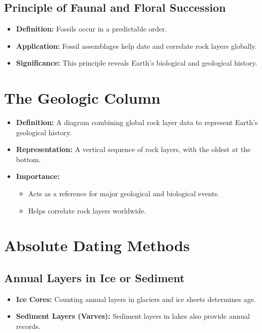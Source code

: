 \documentclass[12pt]{article}
\begin{document}
\subsection*{Principle of Faunal and Floral Succession}
\begin{itemize}
    \item \textbf{Definition:} Fossils occur in a predictable order.
    \item \textbf{Application:} Fossil assemblages help date and correlate rock layers globally.
    \item \textbf{Significance:} This principle reveals Earth's biological and geological history.
\end{itemize}

\section*{The Geologic Column}
\begin{itemize}
    \item \textbf{Definition:} A diagram combining global rock layer data to represent Earth's geological history.
    \item \textbf{Representation:} A vertical sequence of rock layers, with the oldest at the bottom.
    \item \textbf{Importance:}
    \begin{itemize}
        \item Acts as a reference for major geological and biological events.
        \item Helps correlate rock layers worldwide.
    \end{itemize}
\end{itemize}

\section*{Absolute Dating Methods}
\subsection*{Annual Layers in Ice or Sediment}
\begin{itemize}
    \item \textbf{Ice Cores:} Counting annual layers in glaciers and ice sheets determines age.
    \item \textbf{Sediment Layers (Varves):} Sediment layers in lakes also provide annual records.
\end{itemize}
\end{document}
